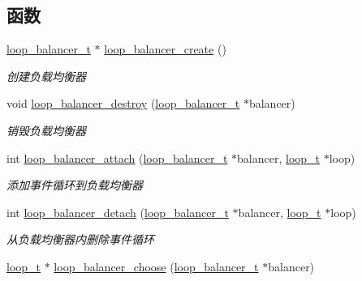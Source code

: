\subsection*{函数}
\begin{DoxyCompactItemize}
\item 
\hyperlink{a00050_a649c7e850ab247b5f70ad27e335a129d_a649c7e850ab247b5f70ad27e335a129d}{loop\+\_\+balancer\+\_\+t} $\ast$ \hyperlink{a00105_ga9992a50e96839282c678e51bc11158d1_ga9992a50e96839282c678e51bc11158d1}{loop\+\_\+balancer\+\_\+create} ()
\begin{DoxyCompactList}\small\item\em 创建负载均衡器 \end{DoxyCompactList}\item 
void \hyperlink{a00105_ga2d702b5f965fe587fdaea3f5f9e2400c_ga2d702b5f965fe587fdaea3f5f9e2400c}{loop\+\_\+balancer\+\_\+destroy} (\hyperlink{a00050_a649c7e850ab247b5f70ad27e335a129d_a649c7e850ab247b5f70ad27e335a129d}{loop\+\_\+balancer\+\_\+t} $\ast$balancer)
\begin{DoxyCompactList}\small\item\em 销毁负载均衡器 \end{DoxyCompactList}\item 
int \hyperlink{a00105_ga2b3cf2cb63d914efe226e901a50d8b0a_ga2b3cf2cb63d914efe226e901a50d8b0a}{loop\+\_\+balancer\+\_\+attach} (\hyperlink{a00050_a649c7e850ab247b5f70ad27e335a129d_a649c7e850ab247b5f70ad27e335a129d}{loop\+\_\+balancer\+\_\+t} $\ast$balancer, \hyperlink{a00050_a9c3ad1cd2de83e09f3a7b59fa82c94ee_a9c3ad1cd2de83e09f3a7b59fa82c94ee}{loop\+\_\+t} $\ast$loop)
\begin{DoxyCompactList}\small\item\em 添加事件循环到负载均衡器 \end{DoxyCompactList}\item 
int \hyperlink{a00105_ga548ce0c2c624c4f4731a0f963d2ca42a_ga548ce0c2c624c4f4731a0f963d2ca42a}{loop\+\_\+balancer\+\_\+detach} (\hyperlink{a00050_a649c7e850ab247b5f70ad27e335a129d_a649c7e850ab247b5f70ad27e335a129d}{loop\+\_\+balancer\+\_\+t} $\ast$balancer, \hyperlink{a00050_a9c3ad1cd2de83e09f3a7b59fa82c94ee_a9c3ad1cd2de83e09f3a7b59fa82c94ee}{loop\+\_\+t} $\ast$loop)
\begin{DoxyCompactList}\small\item\em 从负载均衡器内删除事件循环 \end{DoxyCompactList}\item 
\hyperlink{a00050_a9c3ad1cd2de83e09f3a7b59fa82c94ee_a9c3ad1cd2de83e09f3a7b59fa82c94ee}{loop\+\_\+t} $\ast$ \hyperlink{a00071_ac025f218f22410cf0e60980bbd93c5e3_ac025f218f22410cf0e60980bbd93c5e3}{loop\+\_\+balancer\+\_\+choose} (\hyperlink{a00050_a649c7e850ab247b5f70ad27e335a129d_a649c7e850ab247b5f70ad27e335a129d}{loop\+\_\+balancer\+\_\+t} $\ast$balancer)

\end{DoxyCompactItemize}
